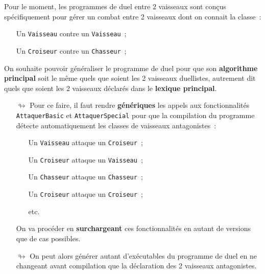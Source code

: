 \documentclass[10pt, fleqn, a4paper]{article}
\newcommand{\bfcolor}[2]{\textcolor{#1}{\textbf{#2}}}
\begin{document}
Pour le moment, les programmes de duel entre 2 vaisseaux sont conçus spécifiquement pour gérer un combat entre 2 vaisseaux dont on connait la classe~:
\begin{itemize}
\item[\ding{223}] Un \texttt{Vaisseau} contre un \texttt{Vaisseau}~;
\item[\ding{223}] Un \texttt{Croiseur} contre un \texttt{Chasseur}~;
\end{itemize}

On souhaite pouvoir généraliser le programme de duel pour que son \textbf{algorithme principal} soit le même quels que soient les 2 vaisseaux \og{}duellistes\fg{}, autrement dit quels que soient les 2 vaisseaux déclarés dans le \textbf{lexique principal}.

\begin{itemize}
\item[$\looparrowright$] Pour ce faire, il faut rendre \textbf{génériques} les appels aux fonctionnalités \texttt{AttaquerBasic} et \texttt{AttaquerSpecial} pour que la compilation du programme \og{}détecte automatiquement\fg{} les classes de vaisseaux antagonistes~:
\begin{itemize}
\item[\ding{223}] Un \texttt{Vaisseau} attaque un \texttt{Croiseur}~;
\item[\ding{223}] Un \texttt{Croiseur} attaque un \texttt{Vaisseau}~;
\item[\ding{223}] Un \texttt{Chasseur} attaque un \texttt{Chasseur}~;
\item[\ding{223}] Un \texttt{Croiseur} attaque un \texttt{Croiseur}~;
\item[\ding{223}] etc.
\end{itemize}
On va procéder en \bfcolor{redCM}{surchargeant} ces fonctionnalités en autant de versions que de cas possibles.
\item[$\looparrowright$] On peut alors générer autant d'exécutables du programme de duel en ne changeant avant compilation que la déclaration des 2 vaisseaux antagonistes.
\end{itemize}


\end{document}
